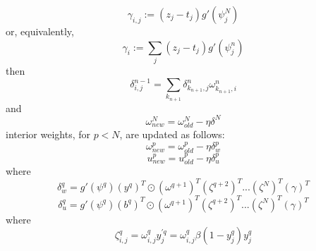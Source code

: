 \documentclass{article}
\begin{document}
%
\begin{equation} \label{eq:gamma}
\gamma_{i,j} := (z_j - t_j) g'(\psi_j^N)
\end{equation}
%
or, equivalently,
%
\begin{equation} \label{eq:gamma_array}
\gamma_i := \sum_j (z_j - t_j) g'(\psi_j^n)
\end{equation}
%
then
%
\begin{equation} \label{eq:delta2}
\delta_{i,j}^{n-1} =
\sum_{k_{n+1}} \delta_{k_{n+1},j}^n \omega_{k_{n+1},i}^n
\end{equation}
%
and
%
\begin{equation} \label{eq:end_weights}
\omega_{new}^N = \omega_{old}^N - \eta \delta^N
\end{equation}
%
interior weights, for $p < N$, are updated as follows:
%
\begin{equation} \label{eq:w_weights}
\omega_{new}^p = \omega_{old}^p - \eta \delta_w^p
\end{equation}
%
\begin{equation} \label{eq:u_weights}
u_{new}^p = u_{old}^p - \eta \delta_u^p
\end{equation}
%
where
%
\begin{equation} \label{eq:w_delta}
\delta_w^{q} = g'(\psi^{q}) (y^{q})^T \odot (\omega^{q+1})^T (\zeta^{q+2})^T ... (\zeta^N)^T (\gamma)^T
\end{equation}
%
\begin{equation} \label{eq:u_delta}
\delta_u^{q} = g'(\psi^{q}) (b^{q})^T \odot (\omega^{q+1})^T (\zeta ^{q+2})^T ... (\zeta^N)^T (\gamma)^T
\end{equation}
%
where
%
\begin{equation} \label{eq:u_delta}
\zeta_{i,j}^q = \omega_{i,j}^q y_j^{\prime q} = \omega_{i,j}^q \beta (1 - y_j^q) y_j^q
\end{equation}
%
\end{document}
